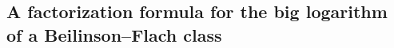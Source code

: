\documentclass[a4paper,11pt]{amsart}
\theoremstyle{plain}
\newtheorem{theorem}{Theorem}[section]
\theoremstyle{definition}
\theoremstyle{remark}
\newtheorem{remarkwr}[theorem]{Remark}
\newenvironment{remark}{\begin{remarkwr}\begin{upshape}}{\end{upshape}\end{remarkwr}}
\newcommand{\res}{\mathrm{res}}
\numberwithin{equation}{section}
\begin{document}

\subsection{A factorization formula for the big logarithm of a Beilinson--Flach class}
\end{document}
